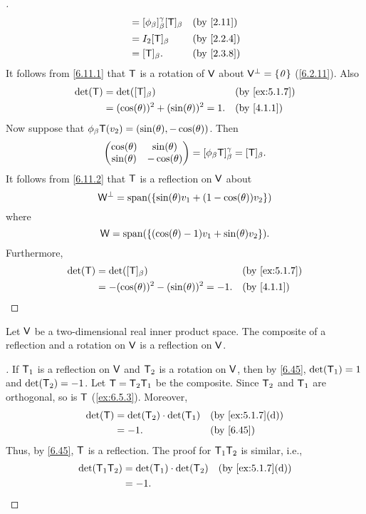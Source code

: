 \begin{proof}[]
\begin{align*}
                                    & = [\phi_{\beta}]_{\beta}^{\gamma} [\T]_{\beta} &  & \by{2.11}  \\
                                    & = I_2 [\T]_{\beta}                             &  & \by{2.2.4} \\
                                    & = [\T]_{\beta}.                                &  & \by{2.3.8}
  \end{align*}
  It follows from \cref{6.11.1} that \(\mathsf{T}\) is a rotation of \(\mathsf{V}\) about \(\mathsf{V}^{\perp} = \left\lbrace\mathit{0}\right\rbrace\) (\cref{6.2.11}).
  Also
  \begin{align*}
    \det(\T) & = \det([\T]_{\beta})                       &  & \by{ex:5.1.7} \\
             & = (\cos(\theta))^2 + (\sin(\theta))^2 = 1. &  & \by{4.1.1}
  \end{align*}
  Now suppose that \(\phi_{\beta} \mathsf{T}(v_2) = (\sin(\theta), -\cos(\theta))\).
  Then
  \[
    \begin{pmatrix}
      \cos(\theta) & \sin(\theta)  \\
      \sin(\theta) & -\cos(\theta)
    \end{pmatrix} = [\phi_{\beta} \mathsf{T}]_{\beta}^{\gamma} = [\mathsf{T}]_{\beta}.
  \]
  It follows from \cref{6.11.2} that \(\mathsf{T}\) is a reflection on \(\mathsf{V}\) about
  \[
    \W^{\perp} = \spn{\set{\sin(\theta) v_1 + (1 - \cos(\theta)) v_2}}
  \]
  where
  \[
    \W = \spn{\set{(\cos(\theta) - 1) v_1 + \sin(\theta) v_2}}.
  \]
  Furthermore,
  \begin{align*}
    \det(\T) & = \det([\T]_{\beta})                          &  & \by{ex:5.1.7} \\
             & = - (\cos(\theta))^2 - (\sin(\theta))^2 = -1. &  & \by{4.1.1}
  \end{align*}
\end{proof}

\begin{cor}\label{6.11.5}
  Let \(\mathsf{V}\) be a two-dimensional real inner product space.
  The composite of a reflection and a rotation on \(\mathsf{V}\) is a reflection on \(\mathsf{V}\).
\end{cor}

\begin{proof}[]
  If \(\mathsf{T}_1\) is a reflection on \(\mathsf{V}\) and \(\mathsf{T}_2\) is a rotation on \(\mathsf{V}\), then by \cref{6.45}, \(\det(\mathsf{T}_1) = 1\) and \(\det(\mathsf{T}_2) = -1\).
  Let \(\mathsf{T} = \mathsf{T}_2 \mathsf{T}_1\) be the composite.
  Since \(\mathsf{T}_2\) and \(\mathsf{T}_1\) are orthogonal, so is \(\mathsf{T}\) (\cref{ex:6.5.3}).
  Moreover,
  \begin{align*}
    \det(\T) & = \det(\T_2) \cdot \det(\T_1) &  & \by{ex:5.1.7}[d] \\
             & = -1.                         &  & \by{6.45}
  \end{align*}
  Thus, by \cref{6.45}, \(\mathsf{T}\) is a reflection.
  The proof for \(\mathsf{T}_1 \mathsf{T}_2\) is similar, i.e.,
  \begin{align*}
    \det(\T_1 \T_2) & = \det(\T_1) \cdot \det(\T_2) &  & \by{ex:5.1.7}[d] \\
                    & = -1.
  \end{align*}
\end{proof}

